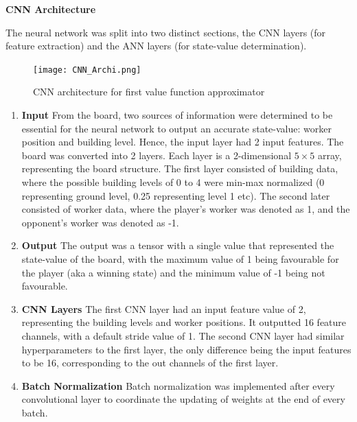 \documentclass[a4paper,12pt,table]{article}
\begin{document}
\textbf{CNN Architecture} 

The neural network was split into two distinct sections, the CNN layers (for feature extraction) and the ANN layers (for state-value determination).   \par

\begin{figure}[H]
    \begin{center}
        \texttt{[image: CNN\_Archi.png]}
        \caption{CNN architecture for first value function approximator}
        \label{fig:}
    \end{center}
\end{figure}

\begin{enumerate}
    
    \item \textbf{Input}
    \newline
    From the board, two sources of information were determined to be essential for the neural network to output an accurate state-value: worker position and building level. Hence, the input layer had 2 input features. The board was converted into 2 layers. Each layer is a 2-dimensional $5\times5$ array, representing the board structure. The first layer consisted of building data, where the possible building levels of 0 to 4 were min-max normalized (0 representing ground level, 0.25 representing level 1 etc). The second later consisted of worker data, where the player’s worker was denoted as 1, and the opponent’s worker was denoted as -1. 
    
    \item \textbf{Output}
    \newline
    The output was a tensor with a single value that represented the state-value of the board, with the maximum value of 1 being favourable for the player (aka a winning state) and the minimum value of -1 being not favourable.
    
    \item \textbf{CNN Layers}
    \newline
    The first CNN layer had an input feature value of 2, representing the building levels and worker positions. It outputted 16 feature channels, with a default stride value of 1. The second CNN layer had similar hyperparameters to the first layer, the only difference being the input features to be 16, corresponding to the out channels of the first layer.
    
    \item \textbf{Batch Normalization}
    \newline
    Batch normalization was implemented after every convolutional layer to coordinate the updating of weights at the end of every batch.
    

\end{enumerate}
\end{document}

